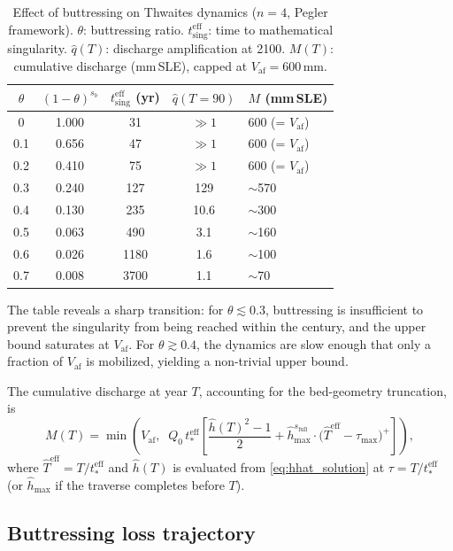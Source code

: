 \documentclass[11pt]{article}
\newcommand{\hhat}{\hat{h}}
\newcommand{\That}{\hat{T}}
\newcommand{\Vaf}{V_{\mathrm{af}}}
\begin{document}
\begin{table}[ht]
\centering
\caption{Effect of buttressing on Thwaites dynamics ($n = 4$, Pegler framework). $\theta$: buttressing ratio. $t_{\mathrm{sing}}^{\mathrm{eff}}$: time to mathematical singularity. $\hat{q}(T)$: discharge amplification at 2100. $M(T)$: cumulative discharge (mm\,SLE), capped at $\Vaf = 600$\,mm.}
\label{tab:buttressing}
\smallskip
\begin{tabular}{c c c c l}
\toprule
$\theta$ & $(1-\theta)^{s_b}$ & $t_{\mathrm{sing}}^{\mathrm{eff}}$ (yr) & $\hat{q}(T=90)$ & $M$ (mm\,SLE) \\
\midrule
0    & 1.000 & 31   & $\gg 1$ & 600 (= $\Vaf$) \\
0.1  & 0.656 & 47   & $\gg 1$ & 600 (= $\Vaf$) \\
0.2  & 0.410 & 75   & $\gg 1$ & 600 (= $\Vaf$) \\
0.3  & 0.240 & 127  & 129 & $\sim$570 \\
0.4  & 0.130 & 235  & 10.6 & $\sim$300 \\
0.5  & 0.063 & 490  & 3.1 & $\sim$160 \\
0.6  & 0.026 & 1180 & 1.6 & $\sim$100 \\
0.7  & 0.008 & 3700 & 1.1 & $\sim$70 \\
\bottomrule
\end{tabular}
\end{table}

The table reveals a sharp transition: for $\theta \lesssim 0.3$, buttressing is insufficient to prevent the singularity from being reached within the century, and the upper bound saturates at $\Vaf$. For $\theta \gtrsim 0.4$, the dynamics are slow enough that only a fraction of $\Vaf$ is mobilized, yielding a non-trivial upper bound.

The cumulative discharge at year $T$, accounting for the bed-geometry truncation, is
\begin{equation}
	M(T) = \min\!\left(\Vaf,\;\; Q_0\,t_*^{\mathrm{eff}}\left[\frac{\hhat(T)^2 - 1}{2} + \hhat_{\max}^{s_{\mathrm{full}}}\cdot\bigl(\That^{\mathrm{eff}} - \tau_{\max}\bigr)^+\right]\right),
	\label{eq:M_buttressed}
\end{equation}
where $\That^{\mathrm{eff}} = T/t_*^{\mathrm{eff}}$ and $\hhat(T)$ is evaluated from \eqref{eq:hhat_solution} at $\tau = T/t_*^{\mathrm{eff}}$ (or $\hhat_{\max}$ if the traverse completes before $T$).

\subsection{Buttressing loss trajectory}
\end{document}
